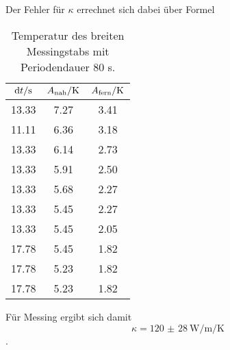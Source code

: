 Der Fehler für $\kappa$ errechnet sich dabei über Formel %

\begin{table}

	\centering

	\caption{Temperatur des breiten Messingstabs mit Periodendauer 80 s.}


	\begin{tabular}{S[table-format=3.2] S[table-format=3.2]S[table-format=3.2]}

		\toprule

		{$\mathrm{d}t/\si[per-mode=reciprocal]{\second}$}&{$A_\text{nah}/\si[per-mode=reciprocal]{\kelvin}$}&{$A_\text{fern}/\si[per-mode=reciprocal]{\kelvin}$} \\

		\midrule

		13.33 & 7.27 & 3.41 \\

		11.11 & 6.36 & 3.18 \\

		13.33 & 6.14 & 2.73 \\

		13.33 & 5.91 & 2.50 \\

		13.33 & 5.68 & 2.27 \\

		13.33 & 5.45 & 2.27 \\

		13.33 & 5.45 & 2.05 \\

		17.78 & 5.45 & 1.82 \\

		17.78 & 5.23 & 1.82 \\

		17.78 & 5.23 & 1.82 \\

		\bottomrule

	\end{tabular}

	\label{tab:tab2}

\end{table}

Für Messing ergibt sich damit \[\kappa = \SI{120(28)}{\watt\per\metre\per\kelvin}\].

